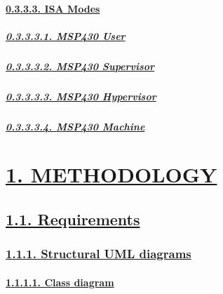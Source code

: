 \documentclass[
]{article}
\begin{document}
\hypertarget{isa-modes-2}{%
\paragraph{\texorpdfstring{\protect\hyperlink{isa-modes-5}{0.3.3.3. ISA
Modes}}{0.3.3.3. ISA Modes}}\label{isa-modes-2}}

\hypertarget{msp430-user}{%
\subparagraph{\texorpdfstring{\protect\hyperlink{msp430-user-1}{0.3.3.3.1.
MSP430 User}}{0.3.3.3.1. MSP430 User}}\label{msp430-user}}

\hypertarget{msp430-supervisor}{%
\subparagraph{\texorpdfstring{\protect\hyperlink{msp430-supervisor-1}{0.3.3.3.2.
MSP430
Supervisor}}{0.3.3.3.2. MSP430 Supervisor}}\label{msp430-supervisor}}

\hypertarget{msp430-hypervisor}{%
\subparagraph{\texorpdfstring{\protect\hyperlink{msp430-hypervisor-1}{0.3.3.3.3.
MSP430
Hypervisor}}{0.3.3.3.3. MSP430 Hypervisor}}\label{msp430-hypervisor}}

\hypertarget{msp430-machine}{%
\subparagraph{\texorpdfstring{\protect\hyperlink{msp430-machine-1}{0.3.3.3.4.
MSP430 Machine}}{0.3.3.3.4. MSP430 Machine}}\label{msp430-machine}}

\hypertarget{methodology}{%
\section{\texorpdfstring{\protect\hyperlink{methodology-1}{1.
METHODOLOGY}}{1. METHODOLOGY}}\label{methodology}}

\hypertarget{requirements}{%
\subsection{\texorpdfstring{\protect\hyperlink{requirements-1}{1.1.
Requirements}}{1.1. Requirements}}\label{requirements}}

\hypertarget{structural-uml-diagrams}{%
\subsubsection{\texorpdfstring{\protect\hyperlink{structural-uml-diagrams-1}{1.1.1.
Structural UML
diagrams}}{1.1.1. Structural UML diagrams}}\label{structural-uml-diagrams}}

\hypertarget{class-diagram}{%
\paragraph{\texorpdfstring{\protect\hyperlink{class-diagram-1}{1.1.1.1.
Class diagram}}{1.1.1.1. Class diagram}}\label{class-diagram}}
\end{document}
